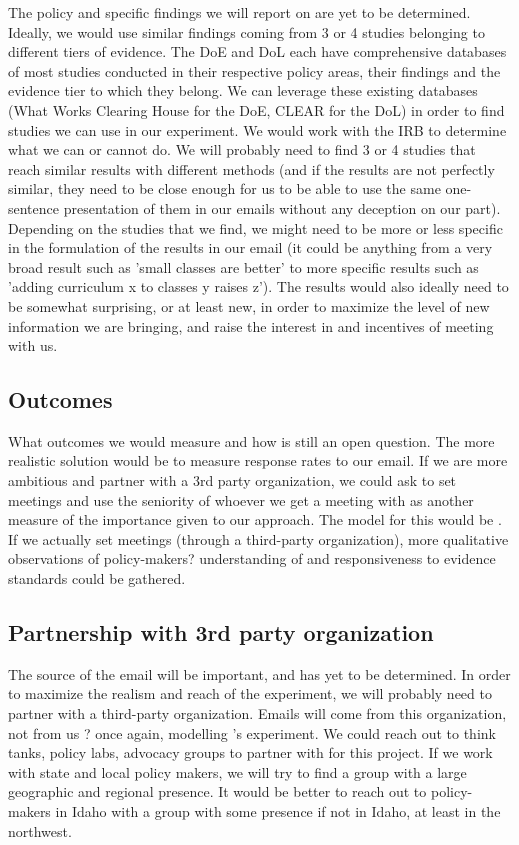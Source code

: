 \documentclass[12pt,final,fleqn]{article}
\theoremstyle{plain}
\begin{document}
The policy and specific findings we will report on are yet to be determined. Ideally, we would use similar findings coming from 3 or 4 studies belonging to different tiers of evidence. The DoE and DoL each have comprehensive databases of most studies conducted in their respective policy areas, their findings and the evidence tier to which they belong. We can leverage these existing databases (What Works Clearing House for the DoE, CLEAR for the DoL) in order to find studies we can use in our experiment. 
\bigbreak
We would work with the IRB to determine what we can or cannot do. We will probably need to find 3 or 4 studies that reach similar results with different methods (and if the results are not perfectly similar, they need to be close enough for us to be able to use the same one-sentence presentation of them in our emails without any deception on our part). Depending on the studies that we find, we might need to be more or less specific in the formulation of the results in our email (it could be anything from a very broad result such as 'small classes are better' to more specific results such as 'adding curriculum x to classes y raises z'). The results would also ideally need to be somewhat surprising, or at least new, in order to maximize the level of new information we are bringing, and raise the interest in and incentives of meeting with us.


\subsection{Outcomes} \label{sec: Outcomes}
What outcomes we would measure and how is still an open question. The more realistic solution would be to measure response rates to our email. If we are more ambitious and partner with a 3rd party organization, we could ask to set meetings and use the seniority of whoever we get a meeting with as another measure of the importance given to our approach. The model for this would be \citet{kalla2016campaign}. If we actually set meetings (through a third-party organization), more qualitative observations of policy-makers? understanding of and responsiveness to evidence standards could be gathered. 

\subsection{Partnership with 3rd party organization} \label{sec: Partnership}

The source of the email will be important, and has yet to be determined. In order to maximize the realism and reach of the experiment, we will probably need to partner with a third-party organization. Emails will come from this organization, not from us ? once again, modelling \citet{kalla2016campaign}'s experiment. We could reach out to think tanks, policy labs, advocacy groups to partner with for this project. If we work with state and local policy makers, we will try to find a group with a large geographic and regional presence. It would be better to reach out to policy-makers in Idaho with a group with some presence if not in Idaho, at least in the northwest. 
\end{document}
